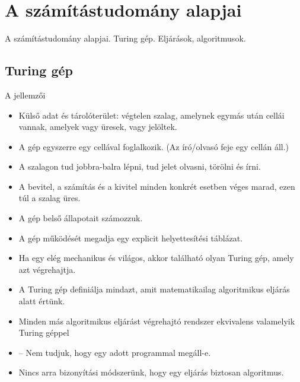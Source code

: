 \documentclass[../../main.tex]{subfiles}
\begin{document}
\section{A számítástudomány alapjai}

\begin{fulltheorem}
  A számítástudomány alapjai. Turing gép. Eljárások, algoritmusok.
\end{fulltheorem}

\subsection{Turing gép}

A  jellemzői

\begin{itemize}
  \item Külső adat és tárolóterület:
        végtelen szalag, amelynek egymás után cellái vannak,
        amelyek vagy üresek, vagy jelöltek.

  \item A gép egyszerre egy cellával foglalkozik.
        (Az író/olvasó feje egy cellán áll.)

  \item A szalagon tud jobbra-balra lépni,
        tud jelet olvasni, törölni és írni.

  \item A bevitel, a számítás és a kivitel minden
        konkrét esetben véges marad, ezen túl a szalag üres.

  \item A gép belső állapotait számozzuk.

  \item A gép működését megadja egy explicit helyettesítési táblázat.

  \item Ha egy  elég mechanikus és világos,
        akkor található olyan Turing gép, amely azt végrehajtja.

  \item A Turing gép definiálja mindazt,
        amit matematikailag algoritmikus eljárás alatt értünk.

  \item Minden más algoritmikus eljárást végrehajtó rendszer
        ekvivalens valamelyik Turing géppel

  \item {}
        -- Nem tudjuk, hogy egy adott programmal megáll-e.

  \item Nincs arra bizonyítási módszerünk,
        hogy egy eljárás biztosan algoritmus.
\end{itemize}
\end{document}
